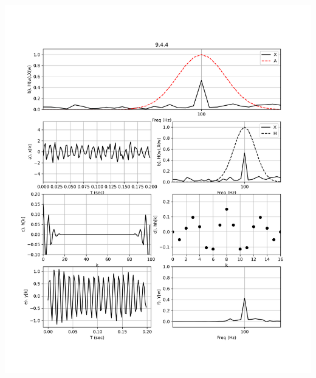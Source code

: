\documentclass[12pt,a4paper]{article}
\begin{document}
\begin{center}
	\includegraphics[height = 9in]{9.4.4.png} 
\end{center}
\end{document}
